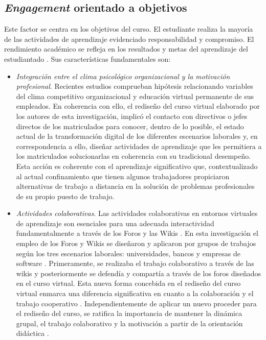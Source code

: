 \documentclass{textolivre}
\begin{document}
\subsection{\emph{Engagement} orientado a objetivos}
Este factor se centra en los objetivos del curso. El estudiante realiza la mayoría de las actividades de aprendizaje evidenciado responsabilidad y compromiso. El rendimiento académico se refleja en los resultados y metas del aprendizaje del estudiantado \cite{stack2015}. %
Sus características fundamentales son:

\begin{itemize}
    \item \emph{Integración entre el clima psicológico organizacional y la motivación profesional}. Recientes estudios \cite{li2020} %
    comprueban hipótesis relacionando variables del clima competitivo organizacional y educación virtual permanente de sus empleados. En coherencia con ello, el rediseño del curso virtual elaborado por los autores de esta investigación, implicó el contacto con directivos o jefes directos de los matriculados para conocer, dentro de lo posible, el estado actual de la transformación digital de los diferentes escenarios laborales y, en correspondencia a ello, diseñar actividades de aprendizaje que les permitiera a los matriculados solucionarlas en coherencia con su tradicional desempeño. Esta acción es coherente con el aprendizaje significativo \cite{cardona2015} %
    que, contextualizado al actual confinamiento que tienen algunos trabajadores propiciaron alternativas de trabajo a distancia en la solución de problemas profesionales de su propio puesto de trabajo.
    
    \item \emph{Actividades colaborativas}. Las actividades colaborativas en entornos virtuales de aprendizaje son esenciales para una adecuada interactividad fundamentalmente a través de los Foros y las Wikis \cite{lin2020}. %
    En esta investigación el empleo de los Foros y Wikis se diseñaron y aplicaron por grupos de trabajos según los tres escenarios laborales: universidades, bancos y empresas de software . Primeramente, se realizaba el trabajo colaborativo a través de las wikis y posteriormente se defendía y compartía a través de los foros diseñados en el curso virtual. Esta nueva forma concebida en el rediseño del curso virtual enmarca una diferencia significativa en cuanto a la colaboración y el trabajo cooperativo . Independientemente de aplicar un nuevo proceder para el rediseño del curso, se ratifica la importancia de mantener la dinámica grupal, el trabajo colaborativo y la motivación a partir de la orientación didáctica \cite{bakker2018, mohd2020, eltahir2021}. %

\end{itemize}
\end{document}
